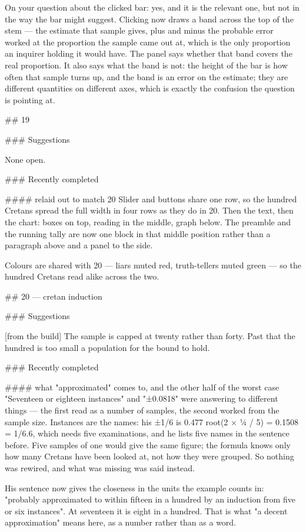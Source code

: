 On your question about the clicked bar: yes, and it is the relevant one, but not
in the way the bar might suggest. Clicking now draws a band across the top of
the stem — the estimate that sample gives, plus and minus the probable error
worked at the proportion the sample came out at, which is the only proportion an
inquirer holding it would have. The panel says whether that band covers the real
proportion. It also says what the band is not: the height of the bar is how
often that sample turns up, and the band is an error on the estimate; they are
different quantities on different axes, which is exactly the confusion the
question is pointing at.

## 19

### Suggestions

None open.

### Recently completed

#### relaid out to match 20
Slider and buttons share one row, so the hundred Cretans spread the full width
in four rows as they do in 20. Then the text, then the chart: boxes on top,
reading in the middle, graph below. The preamble and the running tally are now
one block in that middle position rather than a paragraph above and a panel to
the side.

Colours are shared with 20 — liars muted red, truth-tellers muted green — so the
hundred Cretans read alike across the two.


## 20 — cretan induction

### Suggestions

[from the build] The sample is capped at twenty rather than forty. Past that the
hundred is too small a population for the bound to hold.

### Recently completed

#### what "approximated" comes to, and the other half of the worst case
"Seventeen or eighteen instances" and "±0.0818" were answering to different
things — the first read as a number of samples, the second worked from the
sample size. Instances are the names: his ±1/6 is 0.477 root(2 × ¼ / 5) =
0.1508 = 1/6.6, which needs five examinations, and he lists five names in the
sentence before. Five samples of one would give the same figure; the formula
knows only how many Cretans have been looked at, not how they were grouped. So
nothing was rewired, and what was missing was said instead.

His sentence now gives the closeness in the units the example counts in:
"probably approximated to within fifteen in a hundred by an induction from five
or six instances". At seventeen it is eight in a hundred. That is what "a decent
approximation" means here, as a number rather than as a word.


